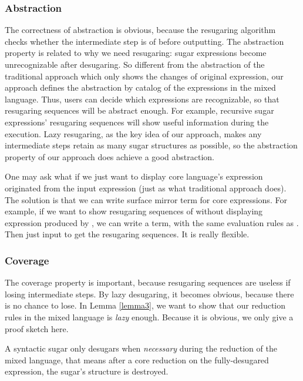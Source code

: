 
\subsubsection{Abstraction}
\label{mark:abs}
The correctness of abstraction is obvious, because the resugaring algorithm checks whether the intermediate step is of  before outputting. The abstraction property is related to why we need resugaring: sugar expressions become unrecognizable after desugaring. So different from the abstraction of the traditional approach which only shows the changes of original expression, our approach defines the abstraction by catalog of the expressions in the mixed language. Thus, users can decide which expressions are recognizable, so that resugaring sequences will be abstract enough. For example, recursive sugar expressions' resugaring sequences will show useful information during the execution. Lazy resugaring, as the key idea of our approach, makes any intermediate steps retain as many sugar structures as possible, so the abstraction property of our approach does achieve a good abstraction.

One may ask what if we just want to display core language's expression originated from the input expression (just as what traditional approach does). The solution is that we can write surface mirror term for core expressions. For example, if we want to show resugaring sequences of  without displaying  expression produced by , we can write a  term, with the same evaluation rules as . Then just input  to get the resugaring sequences. It is really flexible.

\subsubsection{Coverage}
The coverage property is important, because resugaring sequences are useless if losing intermediate steps. By lazy desugaring, it becomes obvious, because there is no chance to lose. In Lemma \ref{lemma3}, we want to show that our reduction rules in the mixed language is \emph{lazy} enough. Because it is obvious, we only give a proof sketch here.
\begin{lemma}[Coverage]
\label{lemma3}
A syntactic sugar only desugars when \emph{necessary} during the reduction of the mixed language, that means after a core reduction on the fully-desugared expression, the sugar's structure is destroyed.
\end{lemma}


